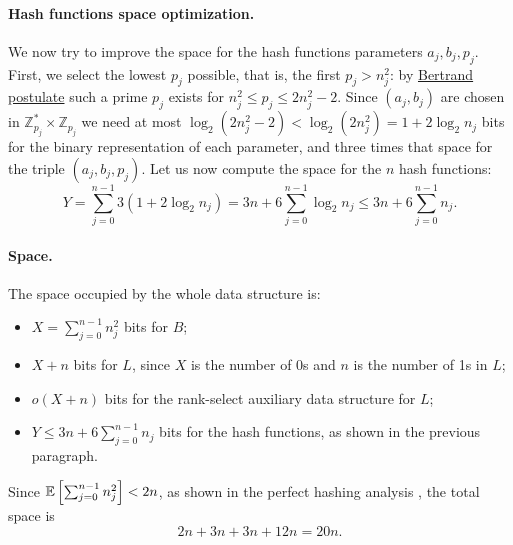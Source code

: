 \paragraph{Hash functions space optimization.} We now try to improve the space for the hash functions parameters $a_j, b_j, p_j$. First, we select the lowest $p_j$ possible, that is, the first $p_j > n_j^2$: by \href{https://en.wikipedia.org/wiki/Bertrand\%27s_postulate}{Bertrand postulate} such a prime $p_j$ exists for $n_j^2 \leq p_j \leq 2n_j^2 - 2$. Since $(a_j, b_j)$ are chosen in $\mathbb{Z}_{p_j}^* \times \mathbb{Z}_{p_j}$ we need at most $\log_2 (2n_j^2-2) < \log_2 (2n_j^2) = 1 + 2\log_2 n_j$ bits for the binary representation of each parameter, and three times that space for the triple $(a_j, b_j, p_j)$. Let us now compute the space for the $n$ hash functions:
\begin{equation*}
  Y = \sum_{j=0}^{n-1} 3{(1 + 2\log_2 n_j)}
    = 3n + 6\sum_{j=0}^{n-1} \log_2 n_j
    \leq 3n + 6\sum_{j=0}^{n-1} n_j.
\end{equation*}

\paragraph{Space.} The space occupied by the whole data structure is:
\begin{itemize}
  \item $X = \sum_{j=0}^{n-1}n_j^2$ bits for $B$;
  \item $X + n$ bits for $L$, since $X$ is the number of 0s and $n$ is the number of 1s in $L$;
  \item $o(X + n)$ bits for the rank-select auxiliary data structure for $L$;
  \item $Y \leq 3n + 6\sum_{j=0}^{n-1} n_j$ bits for the hash functions, as shown in the previous paragraph.
\end{itemize}
Since $\mathbb{E}\left[{\sum_{j=0}^{n-1}n_j^2}\right] < 2n$, as shown in the perfect hashing analysis \cite[281]{Cormen09}, the total space is 
$$2n + 3n + 3n + 12n = 20n.$$

